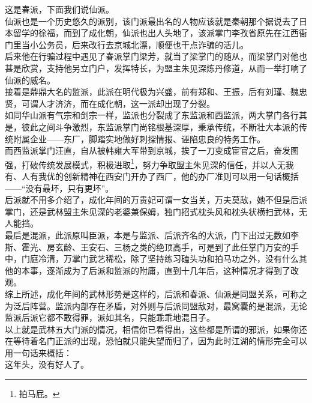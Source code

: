 \begin{multicols}{\theparacolNo}
这是春派，下面我们说仙派。\\

仙派也是一个历史悠久的派别，该门派最出名的人物应该就是秦朝那个据说去了日本留学的徐福，而到了成化朝，仙派也出人头地了，该派掌门李孜省原先在江西衙门里当小公务员，后来改行去京城北漂，顺便也干点诈骗的活儿。\\

后来他在行骗过程中遇见了春派掌门梁芳，就当了梁掌门的随从，而梁掌门对他也甚是欣赏，支持他另立门户，发挥特长，为盟主朱见深炼丹修道，从而一举打响了仙派的威名。\\

接着是鼎鼎大名的监派，此派在明代极为兴盛，前有郑和、王振，后有刘瑾、魏忠贤，可谓人才济济，而在成化朝，这一派却出现了分裂。\\

如同华山派有气宗和剑宗一样，监派也分裂成了东监派和西监派，两大掌门各行其是，彼此之间斗争激烈，东监派掌门尚铭根基深厚，秉承传统，不断壮大本派的传统附属企业——东厂，脚踏实地做好刺探情报、诬陷忠良的特务工作。\\

而西监派掌门汪直，自从被韩雍大军带到京城，挨了一刀变成宦官之后，奋发图强，打破传统发展模式，积极进取\footnote{拍马屁。}，努力争取盟主朱见深的信任，并以人无我有、人有我优的创新精神在西安门开办了西厂，他的办厂准则可以用一句话概括——“没有最坏，只有更坏”。\\

后派就不用多介绍了，成化年间的万贵妃可谓一女当关，万夫莫敌，她不但是后派掌门，还是武林盟主朱见深的老婆兼保姆，独门招式枕头风和枕头状横扫武林，无人能挡。\\

最后是混派，此派原叫臣派，本是与监派、后派齐名的大派，门下出过无数如李斯、霍光、房玄龄、王安石、三杨之类的绝顶高手，可是到了此任掌门万安的手中，门庭冷清，万掌门武艺稀松，除了坚持练习磕头功和拍马功之外，没有什么其他的本事，逐渐成为了后派和监派的附庸，直到十几年后，这种情况才得到了改观。\\

综上所述，成化年间的武林形势是这样的，后派和春派、仙派是同盟关系，可称之为泛后阵营。监派内部存在矛盾，对外则与后派同盟敌对，最窝囊的是混派，无论监派后派它都不敢得罪，派如其名，只能乖乖地混日子。\\

以上就是武林五大门派的情况，相信你已看得出，这些都是所谓的邪派，如果你还在等待着名门正派的出现，恐怕就只能失望而归了，因为此时江湖的情形完全可以用一句话来概括：\\

这年头，没有好人了。\\


\end{multicols}
